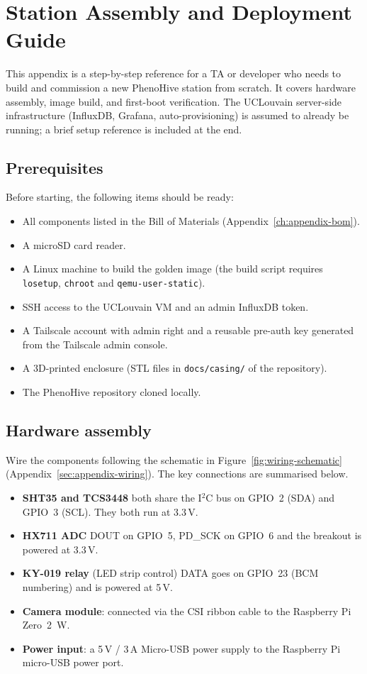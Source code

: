 \chapter{Station Assembly and Deployment Guide}
\label{ch:appendix-deployment-guide}

This appendix is a step-by-step reference for a TA or developer who needs to build and commission a new PhenoHive station from scratch. It covers hardware assembly, image build, and first-boot verification. The UCLouvain server-side infrastructure (InfluxDB, Grafana, auto-provisioning) is assumed to already be running; a brief setup reference is included at the end.

\section{Prerequisites}

Before starting, the following items should be ready:
\begin{itemize}
    \item All components listed in the Bill of Materials (Appendix~\ref{ch:appendix-bom}).
    \item A microSD card reader.
    \item A Linux machine to build the golden image (the build script requires \texttt{losetup}, \texttt{chroot} and \texttt{qemu-user-static}).
    \item SSH access to the UCLouvain VM and an admin InfluxDB token.
    \item A Tailscale account with admin right and a reusable pre-auth key generated from the Tailscale admin console.
    \item A 3D-printed enclosure (STL files in \texttt{docs/casing/} of the repository).
    \item The PhenoHive repository cloned locally.
\end{itemize}

\section{Hardware assembly}

Wire the components following the schematic in Figure~\ref{fig:wiring-schematic} (Appendix~\ref{sec:appendix-wiring}). The key connections are summarised below.

\begin{itemize}
    \item \textbf{SHT35 and TCS3448} both share the I$^2$C bus on GPIO~2 (SDA) and GPIO~3 (SCL). They both run at 3.3\,V.
    \item \textbf{HX711 ADC} DOUT on GPIO~5, PD\_SCK on GPIO~6 and the breakout is powered at 3.3\,V.
    \item \textbf{KY-019 relay} (LED strip control) DATA goes on GPIO~23 (BCM numbering) and is powered at 5\,V.
    \item \textbf{Camera module}: connected via the CSI ribbon cable to the Raspberry Pi Zero~2~W.
    \item \textbf{Power input}: a 5\,V / 3\,A Micro-USB power supply to the Raspberry Pi micro-USB power port.
\end{itemize}

